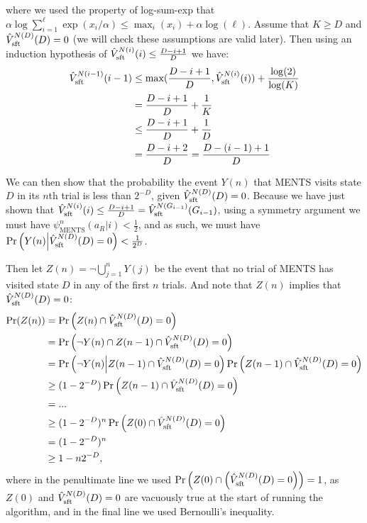 \documentclass{article}
\newcommand{\Vst}[2]{\hat{V}^{#2}_{\textnormal{sft}}(#1)}
\theoremstyle{plain}
\newenvironment{proofoutline}{\proof[Proof outline]}{\endproof}
\begin{document}
\begin{appendices}
\begin{proofoutline}
	        where we used the property of log-sum-exp that $\alpha \log \sum_{i=1}^\ell \exp (x_i/\alpha) \leq \max_i (x_i) + \alpha \log(\ell)$. Assume that $K \geq D$ and $\Vst{D}{N(D)}=0$ (we will check these assumptions are valid later). Then using an induction hypothesis of $\Vst{i}{N(i)}\leq \frac{D-i+1}{D}$ we have:
	         \begin{align}
	         	\Vst{i-1}{N(i-1)} & \leq \max(\frac{D-i+1}{D},\Vst{i}{N(i)}) + \frac{\log(2)}{\log(K)} \\
	         		& = \frac{D-i+1}{D} + \frac{1}{K} \\
	         		& \leq \frac{D-i+1}{D} + \frac{1}{D} \\
	         		& = \frac{D-i+2}{D} = \frac{D-(i-1)+1}{D}
	         \end{align}
	         
	         We can then show that the probability the event $Y(n)$ that MENTS visits state $D$ in its $n$th trial is less than $2^{-D}$, given $\Vst{D}{N(D)}=0$. Because we have just shown that $\Vst{i}{N(i)}\leq \frac{D-i+1}{D} = \Vst{G_{i-1}}{N(G_{i-1})}$, using a symmetry argument we must have $\psi^n_{\text{MENTS}}(a_R|i) < \frac{1}{2}$, and as such, we must have $\Pr\left(Y(n) \middle| \Vst{D}{N(D)}=0\right) < \frac{1}{2^D}$. 
	         
	         Then let $Z(n)=\neg \bigcup_{j=1}^n Y(j)$ be the event that no trial of MENTS has visited state $D$ in any of the first $n$ trials. And note that $Z(n)$ implies that $\Vst{D}{N(D)}=0$:
	         \begin{align}
	         	\Pr(Z(n)) 
	         		&= \Pr\left(Z(n) 	              \cap \Vst{D}{N(D)}=0\right) 													\\
	         		&= \Pr\left(\neg Y(n) \cap Z(n-1) \cap \Vst{D}{N(D)} = 0 \right) 													\\
	         		&= \Pr\left(\neg Y(n) \middle|    Z(n-1) \cap \Vst{D}{N(D)} = 0 \right) 	\Pr\left( Z(n-1) \cap \Vst{D}{N(D)} = 0 \right) 	\\
	         		&\geq (1-2^{-D}) 													    \Pr\left( Z(n-1) \cap \Vst{D}{N(D)} = 0 \right) 	\\
	         		&= ... 																											\\
	         		&\geq (1-2^{-D})^n \Pr\left( Z(0) \cap \Vst{D}{N(D)}=0\right) \\
	         		&= (1-2^{-D})^n \\
	         		&\geq 1-n2^{-D},
	         \end{align}
	         where in the penultimate line we used $\Pr\left( Z(0) \cap \left(\Vst{D}{N(D)}=0\right)\right)=1$, as $Z(0)$ and $\Vst{D}{N(D)}=0$ are vacuously true at the start of running the algorithm, and in the final line we used Bernoulli's inequality.
	         

\end{proofoutline}
\end{appendices}
\end{document}

